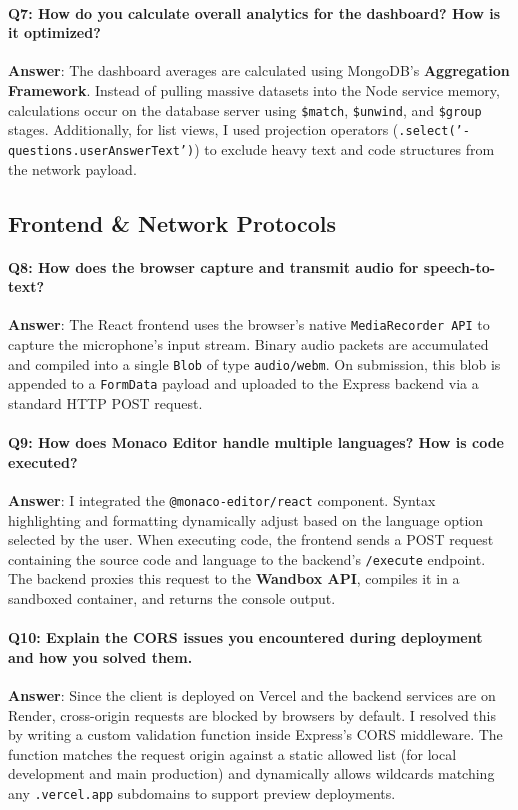 \documentclass[11pt,a4paper]{article}
\begin{document}
\paragraph{Q7: How do you calculate overall analytics for the dashboard? How is it optimized?}
\textbf{Answer}: The dashboard averages are calculated using MongoDB's \textbf{Aggregation Framework}. Instead of pulling massive datasets into the Node service memory, calculations occur on the database server using \texttt{\$match}, \texttt{\$unwind}, and \texttt{\$group} stages. Additionally, for list views, I used projection operators (\texttt{.select('-questions.userAnswerText')}) to exclude heavy text and code structures from the network payload.

\subsection{Frontend \& Network Protocols}

\paragraph{Q8: How does the browser capture and transmit audio for speech-to-text?}
\textbf{Answer}: The React frontend uses the browser's native \texttt{MediaRecorder API} to capture the microphone's input stream. Binary audio packets are accumulated and compiled into a single \texttt{Blob} of type \texttt{audio/webm}. On submission, this blob is appended to a \texttt{FormData} payload and uploaded to the Express backend via a standard HTTP POST request.

\paragraph{Q9: How does Monaco Editor handle multiple languages? How is code executed?}
\textbf{Answer}: I integrated the \texttt{@monaco-editor/react} component. Syntax highlighting and formatting dynamically adjust based on the language option selected by the user. When executing code, the frontend sends a POST request containing the source code and language to the backend's \texttt{/execute} endpoint. The backend proxies this request to the \textbf{Wandbox API}, compiles it in a sandboxed container, and returns the console output.

\paragraph{Q10: Explain the CORS issues you encountered during deployment and how you solved them.}
\textbf{Answer}: Since the client is deployed on Vercel and the backend services are on Render, cross-origin requests are blocked by browsers by default. I resolved this by writing a custom validation function inside Express's CORS middleware. The function matches the request origin against a static allowed list (for local development and main production) and dynamically allows wildcards matching any \texttt{.vercel.app} subdomains to support preview deployments.
\end{document}
